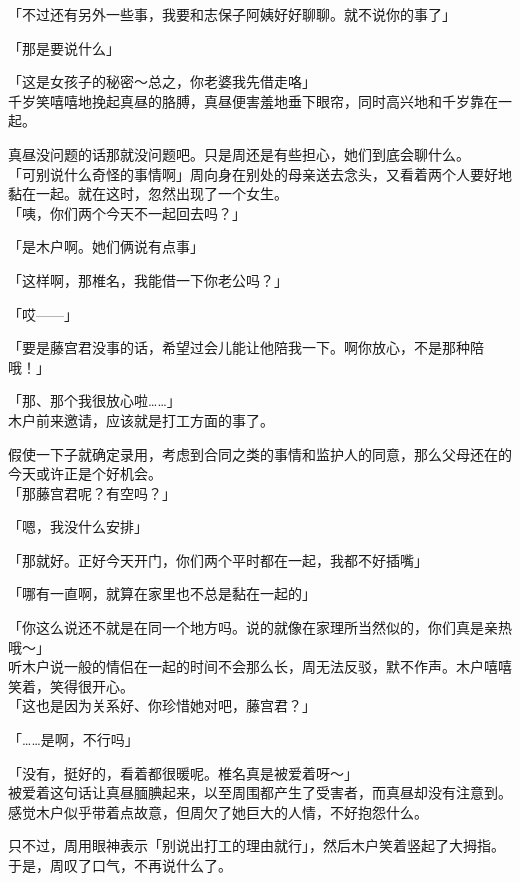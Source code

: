 「不过还有另外一些事，我要和志保子阿姨好好聊聊。就不说你的事了」

「那是要说什么」

「这是女孩子的秘密～总之，你老婆我先借走咯」\\

千岁笑嘻嘻地挽起真昼的胳膊，真昼便害羞地垂下眼帘，同时高兴地和千岁靠在一起。

真昼没问题的话那就没问题吧。只是周还是有些担心，她们到底会聊什么。\\

「可别说什么奇怪的事情啊」周向身在别处的母亲送去念头，又看着两个人要好地黏在一起。就在这时，忽然出现了一个女生。\\

「咦，你们两个今天不一起回去吗？」

「是木户啊。她们俩说有点事」

「这样啊，那椎名，我能借一下你老公吗？」

「哎——」

「要是藤宫君没事的话，希望过会儿能让他陪我一下。啊你放心，不是那种陪哦！」

「那、那个我很放心啦……」\\

木户前来邀请，应该就是打工方面的事了。

假使一下子就确定录用，考虑到合同之类的事情和监护人的同意，那么父母还在的今天或许正是个好机会。\\

「那藤宫君呢？有空吗？」

「嗯，我没什么安排」

「那就好。正好今天开门，你们两个平时都在一起，我都不好插嘴」

「哪有一直啊，就算在家里也不总是黏在一起的」

「你这么说还不就是在同一个地方吗。说的就像在家理所当然似的，你们真是亲热哦～」\\

听木户说一般的情侣在一起的时间不会那么长，周无法反驳，默不作声。木户嘻嘻笑着，笑得很开心。\\

「这也是因为关系好、你珍惜她对吧，藤宫君？」

「……是啊，不行吗」

「没有，挺好的，看着都很暖呢。椎名真是被爱着呀～」\\

被爱着这句话让真昼腼腆起来，以至周围都产生了受害者，而真昼却没有注意到。感觉木户似乎带着点故意，但周欠了她巨大的人情，不好抱怨什么。

只不过，周用眼神表示「别说出打工的理由就行」，然后木户笑着竖起了大拇指。于是，周叹了口气，不再说什么了。
